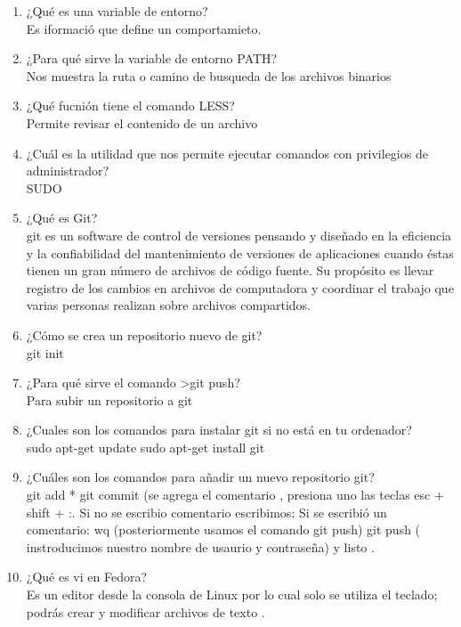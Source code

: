 \documentclass[letterpaper, 12pt, oneside]{article}%
\begin{document}
\begin{enumerate}
    \item ¿Qué es una variable de entorno?\\
Es iformació que define un comportamieto.

    \item ¿Para qué sirve la variable de entorno PATH?\\
Nos muestra la ruta o camino de busqueda de los archivos binarios

    \item ¿Qué fucnión tiene el comando LESS?\\
Permite revisar el contenido de un archivo

    \item ¿Cuál es la utilidad  que nos permite ejecutar comandos con privilegios de administrador?\\
SUDO

    \item ¿Qué es Git?\\
git es un software de control de versiones pensando y diseñado en la eficiencia y la confiabilidad del mantenimiento de versiones de aplicaciones cuando éstas tienen un gran número de archivos de código fuente. 
Su propósito es llevar registro de los cambios en archivos de computadora y coordinar el trabajo que varias personas realizan sobre archivos compartidos.
    
    \item ¿Cómo se crea un repositorio nuevo de git?\\
  git init 

    \item ¿Para qué sirve el comando >git push?\\
Para subir un repositorio a git

    \item ¿Cuales son los comandos para instalar git si no está en tu ordenador?\\
sudo apt-get update
sudo apt-get install git
 
    \item ¿Cuáles son los comandos para añadir un nuevo repositorio git?\\
git add *
git commit (se agrega el comentario , presiona uno las teclas esc + shift + :.
Si no se escribio comentario escribimos:  
Si se escribió un comentario: wq
(posteriormente usamos el comando git push)
git push ( instroducimos nuestro nombre de usaurio y contraseña) y listo .

    
    \item ¿Qué es vi en Fedora?\\
Es un editor desde la consola de Linux por lo cual solo se utiliza el teclado; podrás crear y modificar archivos
de texto .


\end{enumerate}
\end{document}

